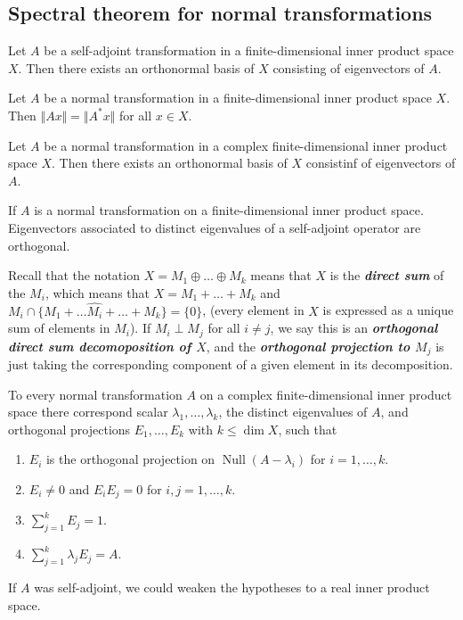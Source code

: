 \documentclass{article}
\theoremstyle{definition}
\numberwithin{equation}{section}
\begin{document}
	\subsection{Spectral theorem for normal transformations}
	\begin{thm}
		Let $A$ be a self-adjoint transformation in a finite-dimensional inner product space $X$. Then there exists an orthonormal basis of $X$ consisting of eigenvectors of $A$.
	\end{thm}
	\begin{lemma}
		Let $A$ be a normal transformation in a finite-dimensional inner product space $X$. Then $\Vert Ax\Vert=\Vert A^*x\Vert$ for all $x\in X$.
	\end{lemma}
	\begin{thm}
		Let $A$ be a normal transformation in a complex finite-dimensional inner product space $X$. Then there exists an orthonormal basis of $X$ consistinf of eigenvectors of $A$.
	\end{thm}
	\begin{thm}
		If $A$ is a normal transformation on a finite-dimensional inner product space. Eigenvectors associated to distinct eigenvalues of a self-adjoint operator are orthogonal.
	\end{thm}
	Recall that the notation $X=M_1\oplus\ldots\oplus M_k$ means that $X$ is the \textbf{\textit{direct sum}} of the $M_i$, which means that $X=M_1+\ldots+M_k$ and $M_i\cap\{M_1+\ldots \hat{M_i}+\ldots+M_k\}=\{0\}$, (every element in $X$ is expressed as a unique sum of elements in $M_i$). If $M_i\perp M_j$ for all $i\neq j$, we say this is an \textbf{\textit{orthogonal direct sum decomoposition of $X$}}, and the \textbf{\textit{orthogonal projection to $M_j$}} is just taking the corresponding component of a given element in its decomposition.
	\begin{thm}
		To every normal transformation $A$ on a complex finite-dimensional inner product space there correspond scalar $\lambda_1,\ldots,\lambda_k$, the distinct eigenvalues of $A$, and orthogonal projections $E_1,\ldots,E_k$ with $k\leq \dim X$, such that
		\begin{enumerate}
			\item $E_i$ is the orthogonal projection on $\operatorname{Null}(A-\lambda_i)$ for $i=1,\ldots,k$.
			\item $E_i\neq0$ and $E_iE_j=0$ for $i,j=1,\ldots,k$.
			\item $\sum_{j=1}^kE_j=1$.
			\item $\sum_{j=1}^k\lambda_jE_j=A$.
		\end{enumerate}
	\end{thm}
	If $A$ was self-adjoint, we could weaken the hypotheses to a real inner product space.
	
\end{document}
